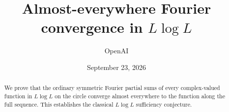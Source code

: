\documentclass[11pt]{article}
\title{Almost-everywhere Fourier convergence in $L\log L$}
\author{OpenAI}
\date{September 23, 2026}
\begin{document}
\maketitle
\begin{abstract}
We prove that the ordinary symmetric Fourier partial sums of every complex-valued function in $L\log L$ on the circle converge almost everywhere to the function along the full sequence. This establishes the classical $L\log L$ sufficiency conjecture.
\end{abstract}
\tableofcontents












\end{document}
